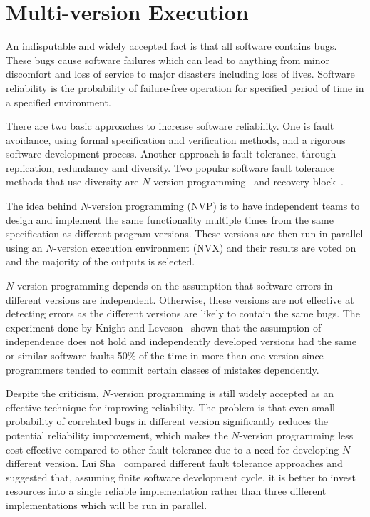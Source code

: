 \chapter{Multi-version Execution}
\label{chap:multi-version}

An indisputable and widely accepted fact is that all software contains bugs.
These bugs cause software failures which can lead to anything from minor
discomfort and loss of service to major disasters including loss of lives.
Software reliability is the probability of failure-free operation for specified
period of time in a specified environment.

There are two basic approaches to increase software reliability. One is fault
avoidance, using formal specification and verification methods, and a rigorous
software development process. Another approach is fault tolerance, through
replication, redundancy and diversity. Two popular software fault tolerance
methods that use diversity are $N$-version programming~\cite{avizienis:nvp} and
recovery block~\cite{randell:rb}.


The idea behind $N$-version programming (NVP) is to have independent teams to
design and implement the same functionality multiple times from the same
specification as different program versions. These versions are then run in
parallel using an $N$-version execution environment (NVX) and their results are
voted on and the majority of the outputs is selected.

$N$-version programming depends on the assumption that software errors in
different versions are independent. Otherwise, these versions are not effective
at detecting errors as the different versions are likely to contain the same
bugs. The experiment done by Knight and Leveson~\cite{knight86,knight90} shown
that the assumption of independence does not hold and independently developed
versions had the same or similar software faults 50\% of the time in more than
one version since programmers tended to commit certain classes of mistakes
dependently.

Despite the criticism, $N$-version programming is still widely accepted as an
effective technique for improving reliability. The problem is that even small
probability of correlated bugs in different version significantly reduces the
potential reliability improvement, which makes the $N$-version programming less
cost-effective compared to other fault-tolerance due to a need for developing
$N$ different version. Lui Sha~\cite{lui01} compared different fault tolerance
approaches and suggested that, assuming finite software development cycle, it
is better to invest resources into a single reliable implementation rather than
three different implementations which will be run in parallel.

